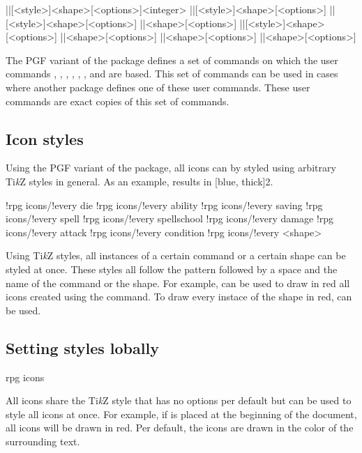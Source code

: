 \documentclass[a4paper]{article}
\begin{document}
\begin{macrodef}
|\rpgiconsdie|[<style>]{<shape>}[<options>]{<integer>}
|\rpgiconsability|[<style>]{<shape>}[<options>]
|\rpgiconssaving|[<style>]{<shape>}[<options>]
|\rpgiconsspell|{<shape>}[<options>]
|\rpgiconsspellschool|[<style>]{<shape>}[<options>]
|\rpgiconsdamage|{<shape>}[<options>]
|\rpgiconsattack|{<shape>}[<options>]
|\rpgiconscondition|{<shape>}[<options>]
\end{macrodef}
The PGF variant of the package defines a set of commands on which the user commands \macro{\die}, \macro{\ability}, \macro{\saving}, \macro{\spell}, \macro{\spellschool}, \macro{\damage}, \macro{\attack} and \macro{\condition} are based. This set of commands can be used in cases where another package defines one of these user commands. These user commands are exact copies of this set of commands.

\subsection{Icon styles}

Using the PGF variant of the package, all icons can by styled using arbitrary Ti\emph{k}Z styles in general. As an example,  results in [blue, thick]{2}.

\begin{macrodef}
!rpg icons/!every die
!rpg icons/!every ability
!rpg icons/!every saving
!rpg icons/!every spell
!rpg icons/!every spellschool
!rpg icons/!every damage
!rpg icons/!every attack
!rpg icons/!every condition
!rpg icons/!every <shape>
\end{macrodef}
Using Ti\emph{k}Z styles, all instances of a certain command or a certain shape can be styled at once. These styles all follow the pattern  followed by a space and the name of the command or the shape. For example,  can be used to draw in red all icons created using the \macro{\die} command. To draw every instace of the  shape in red,  can be used.

\subsection{Setting styles lobally}

\begin{macrodef}rpg icons\end{macrodef}
All icons share the Ti\emph{k}Z style  that has no options per default but can be used to style all icons at once. For example, if  is placed at the beginning of the document, all icons will be drawn in red. Per default, the icons are drawn in the color of the surrounding text. 
\end{document}
